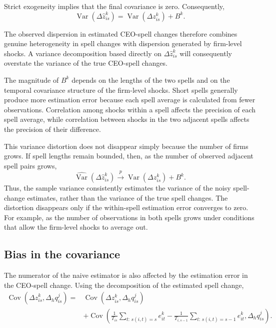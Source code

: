 \documentclass[11pt,a4paper]{article}
\begin{document}
Strict exogeneity implies that the final covariance is zero.
Consequently,
\begin{equation}
\operatorname{Var}\!\left(
\Delta\widehat z_{is}^{k}
\right)
=
\operatorname{Var}\!\left(
\Delta z_{is}^{k}
\right)
+
B^{k}.
\label{eq:variance_bias}
\end{equation}

The observed dispersion in estimated CEO-spell changes therefore
combines genuine heterogeneity in spell changes with dispersion
generated by firm-level shocks. A variance decomposition based directly
on $\Delta\widehat z_{is}^{k}$ will consequently overstate the variance
of the true CEO-spell changes.

The magnitude of $B^{k}$ depends on the lengths of the two spells and
on the temporal covariance structure of the firm-level shocks. Short
spells generally produce more estimation error because each spell
average is calculated from fewer observations. Correlation among shocks
within a spell affects the precision of each spell average, while
correlation between shocks in the two adjacent spells affects the
precision of their difference.

This variance distortion does not disappear simply because the number
of firms grows. If spell lengths remain bounded, then, as the number of
observed adjacent spell pairs grows,
\begin{equation}
\widehat{\operatorname{Var}}\!\left(
\Delta\widehat z_{is}^{k}
\right)
\overset{p}{\longrightarrow}
\operatorname{Var}\!\left(
\Delta z_{is}^{k}
\right)
+
B^{k}.
\label{eq:variance_plim}
\end{equation}
Thus, the sample variance consistently estimates the variance of the
noisy spell-change estimates, rather than the variance of the true
spell changes. The distortion disappears only if the within-spell
estimation error converges to zero. For example, as the number of
observations in both spells grows under conditions that allow the
firm-level shocks to average out.

\subsection{Bias in the covariance}
\label{subsec:covariance_bias}

The numerator of the naive estimator is also affected by the
estimation error in the CEO-spell change. Using the decomposition of
the estimated spell change,
\begin{align}
\operatorname{Cov}\!\left(
\Delta\widehat z_{is}^{k},
\Delta_h q_{is}^{j}
\right)
={}&
\operatorname{Cov}\!\left(
\Delta z_{is}^{k},
\Delta_h q_{is}^{j}
\right)
\nonumber\\
&+
\operatorname{Cov}\!\left(
\frac{1}{T_{is}}
\sum_{t:\,s(i,t)=s} e_{it}^{k}
-
\frac{1}{T_{i,s-1}}
\sum_{t:\,s(i,t)=s-1} e_{it}^{k},
\Delta_h q_{is}^{j}
\right).
\label{eq:covariance_decomposition}
\end{align}
\end{document}
